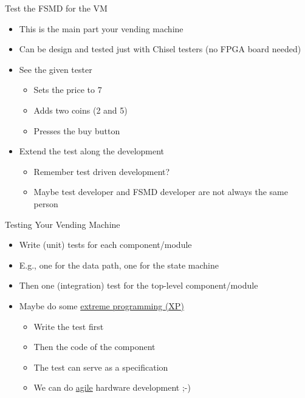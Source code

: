 \begin{frame}[fragile]{Test the FSMD for the VM}
\begin{itemize}
\item This is the main part your vending machine
\item Can be design and tested just with Chisel testers (no FPGA board needed)
\item See the given tester
\begin{itemize}
\item Sets the price to 7
\item Adds two coins (2 and 5)
\item Presses the buy button
\end{itemize}
\item Extend the test along the development
\begin{itemize}
\item Remember test driven development?
\item Maybe test developer and FSMD developer are not always the same person
\end{itemize}
\end{itemize}
\end{frame}


\begin{frame}[fragile]{Testing Your Vending Machine}
\begin{itemize}
\item Write (unit) tests for each component/module
\item E.g., one for the data path, one for the state machine
\item Then one (integration) test for the top-level component/module
\item Maybe do some \href{https://en.wikipedia.org/wiki/Extreme_programming}{extreme programming (XP)}
\begin{itemize}
\item Write the test first
\item Then the code of the component
\item The test can serve as a specification
\item We can do \href{https://en.wikipedia.org/wiki/Agile_software_development}{agile} hardware development ;-)
\end{itemize}
\end{itemize}
\end{frame}

